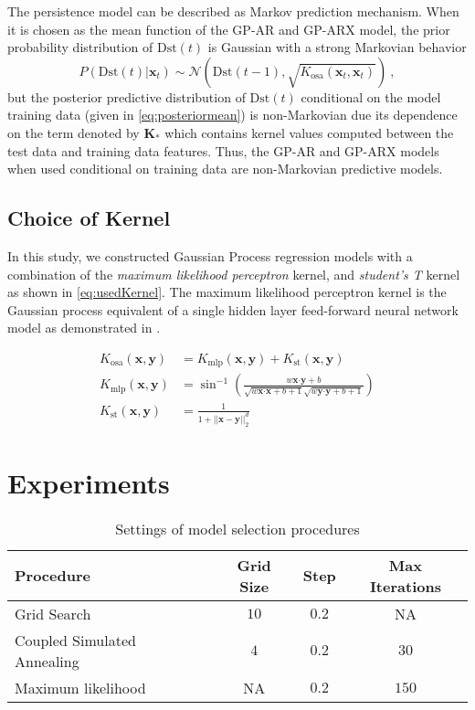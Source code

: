 The persistence model can be described as Markov prediction mechanism. When it is 
chosen as the mean function of the GP-AR and GP-ARX model, the prior probability distribution of 
$\mathrm{Dst}(t)$ is Gaussian with a strong Markovian behavior 
\[
    P(\mathrm{Dst}(t)|\mathbf{x}_t) \sim 
    \mathcal{N}(\mathrm{Dst}(t-1), \sqrt{K_{\text{osa}}(\mathbf{x}_t, \mathbf{x}_t)}) \ ,
\] 
but the posterior predictive distribution of $\mathrm{Dst}(t)$ conditional on the model training 
data (given in \cref{eq:posteriormean}) is non-Markovian due its dependence on the term 
denoted by $\mathbf{K}_{*}$ which contains kernel values computed between the test data and 
training data features. Thus, the GP-AR and GP-ARX models when used conditional on training data are 
non-Markovian predictive models.

\subsection{Choice of Kernel}

In this study, we constructed Gaussian Process regression models with a combination of the 
\emph{maximum likelihood perceptron} kernel, and \emph{student's T} kernel as shown in 
\cref{eq:usedKernel}. The maximum likelihood perceptron kernel is the Gaussian process equivalent 
of a single hidden layer feed-forward neural network model as demonstrated in 
\citet{Neal:1996:BLN:525544}.

\begin{align}
    K_{\text{osa}}(\mathbf{x}, \mathbf{y}) & = K_{\text{mlp}}(\mathbf{x}, \mathbf{y}) + K_{\text{st}}(\mathbf{x}, \mathbf{y}) \label{eq:usedKernel} \\
    K_{\text{mlp}}(\mathbf{x}, \mathbf{y}) & = \sin^{-1}\left(\frac{w\mathbf{x}\boldsymbol{\cdot} \mathbf{y} + b}{\sqrt{w\mathbf{x}\boldsymbol{\cdot} \mathbf{x} + b + 1} \sqrt{w\mathbf{y}\boldsymbol{\cdot} \mathbf{y} + b + 1}}\right) \\
    K_{\text{st}}(\mathbf{x}, \mathbf{y}) & = \frac{1}{1 + ||\mathbf{x} - \mathbf{y}||_{2}^d}
\end{align}

\section{Experiments} \label{sec:modeltraining}

\begin{table}[ht]
    \centering
    \caption{Settings of model selection procedures}
    \begin{tabular}{l c c c}
    \hline
    \textbf{Procedure} & \textbf{Grid Size} & \textbf{Step} & \textbf{Max Iterations} \\
    \hline
    Grid Search & $10$ & $0.2$ & NA \\
    Coupled Simulated Annealing & $4$ & $0.2$ & $30$ \\
    Maximum likelihood & NA & $0.2$ & $150$\\
    \hline
    \end{tabular}
    \label{table:modelselection}
\end{table}

